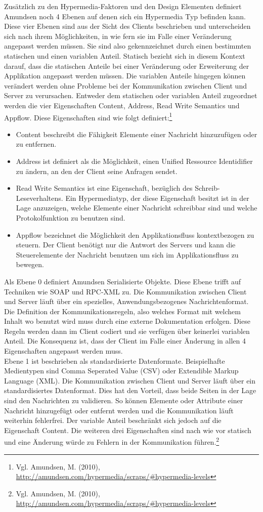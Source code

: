 Zusätzlich zu den Hypermedia-Faktoren und den Design Elementen definiert Amundsen noch 4 Ebenen auf denen sich ein Hypermedia Typ befinden kann. Diese vier Ebenen sind aus der Sicht des Clients beschrieben und unterscheiden sich nach ihrem Möglichkeiten, in wie fern sie im Falle einer Veränderung angepasst werden müssen. Sie sind also gekennzeichnet durch einen bestimmten statischen und einen variablen Anteil. Statisch bezieht sich in diesem Kontext darauf, dass die statischen Anteile bei einer Veränderung oder Erweiterung der Applikation angepasst werden müssen. Die variablen Anteile hingegen können verändert werden ohne Probleme bei der Kommunikation zwischen Client und Server zu verursachen. Entweder dem statischen oder variablen Anteil zugeordnet werden die vier Eigenschaften Content, Address, Read Write Semantics und Appflow. Diese Eigenschaften sind wie folgt definiert:\footnote{Vgl. Amundsen, M. (2010), \url{http://amundsen.com/hypermedia/scraps/#hypermedia-levels}}
\begin{itemize}
\item Content beschreibt die Fähigkeit Elemente einer Nachricht hinzuzufügen oder zu entfernen.
\item Address ist definiert als die Möglichkeit, einen Unified Ressource Identidifier zu ändern, an den der Client seine Anfragen sendet.
\item Read Write Semantics ist eine Eigenschaft, bezüglich des Schreib-Leseverhaltens. Ein Hypermediatyp, der diese Eigenschaft besitzt ist in der Lage anzuzeigen, welche Elemente einer Nachricht schreibbar sind und welche Protokolfunktion zu benutzen sind.
\item Appflow bezeichnet die Möglichkeit den Applikationsfluss kontextbezogen zu steuern. Der Client benötigt nur die Antwort des Servers und kann die Steuerelemente der Nachricht benutzen um sich im Applikationsfluss zu bewegen.
\end{itemize}
Als Ebene 0 definiert Amundsen Serialisierte Objekte. Diese Ebene trifft auf Techniken wie SOAP und RPC-XML zu. Die Kommunikation zwischen Client und Server läuft über ein spezielles, Anwendungsbezogenes Nachrichtenformat. Die Definition der Kommunikationsregeln, also welches Format mit welchem Inhalt wo benutzt wird muss durch eine externe Dokumentation erfolgen. Diese Regeln werden dann im Client codiert und sie verfügen über keinerlei variablen Anteil. Die Konsequenz ist, dass der Client im Falle einer Änderung in allen 4 Eigenschaften angepasst werden muss.\\
Ebene 1 ist beschrieben als standardisierte Datenformate. Beispielhafte Medientypen sind Comma Seperated Value (CSV) oder Extendible Markup Language (XML). Die Kommunikation zwischen Client und Server läuft über ein standardisiertes Datenformat. Dies hat den Vorteil, dass beide Seiten in der Lage sind den Nachrichten zu validieren. So können Elemente oder Attribute einer Nachricht hinzugefügt oder entfernt werden und die Kommunikation läuft weiterhin fehlerfrei. Der variable Anteil beschränkt sich jedoch auf die Eigenschaft Content. Die weiteren drei Eigenschaften sind nach wie vor statisch und eine Änderung würde zu Fehlern in der Kommunikation führen.\footnote{Vgl. Amundsen, M. (2010), \url{http://amundsen.com/hypermedia/scraps/#hypermedia-levels}}\\
